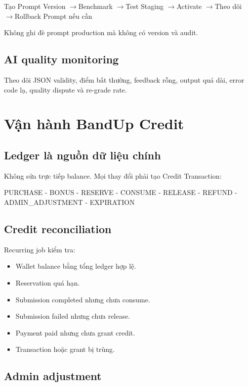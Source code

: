 \documentclass[11pt,a4paper]{article}
\newcommand{\arrow}{\ensuremath{\rightarrow}}
\begin{document}
\begin{flowbox}
Tạo Prompt Version \arrow Benchmark \arrow Test Staging \arrow Activate \arrow Theo dõi \arrow Rollback Prompt nếu cần
\end{flowbox}

Không ghi đè prompt production mà không có version và audit.

\subsection{AI quality monitoring}

Theo dõi JSON validity, điểm bất thường, feedback rỗng, output quá dài, error code lạ, quality dispute và re-grade rate.

\section{Vận hành BandUp Credit}

\subsection{Ledger là nguồn dữ liệu chính}

Không sửa trực tiếp balance. Mọi thay đổi phải tạo Credit Transaction:

\begin{flowbox}
PURCHASE - BONUS - RESERVE - CONSUME - RELEASE - REFUND - ADMIN\_ADJUSTMENT - EXPIRATION
\end{flowbox}

\subsection{Credit reconciliation}

Recurring job kiểm tra:

\begin{itemize}
  \item Wallet balance bằng tổng ledger hợp lệ.
  \item Reservation quá hạn.
  \item Submission completed nhưng chưa consume.
  \item Submission failed nhưng chưa release.
  \item Payment paid nhưng chưa grant credit.
  \item Transaction hoặc grant bị trùng.
\end{itemize}

\subsection{Admin adjustment}
\end{document}
